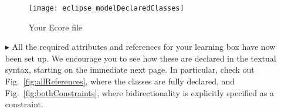 \begin{itemize}
\vspace{1cm}

\begin{figure}[htbp]
	\centering
  \texttt{[image: eclipse\_modelDeclaredClasses]}
	\caption{Your Ecore file}
	\label{fig:model_allClasses}
\end{figure}

\vspace{1cm}

\item[$\blacktriangleright$] All the required attributes and references for your learning box have now been set up. We encourage you to see how these are
declared in the textual syntax, starting on the immediate next page. In particular, check out Fig.~\ref{fig:allReferences}, where the classes are fully
declared, and Fig.~\ref{fig:bothConstraints}, where bidirectionality is explicitly specified as a constraint.


\end{itemize}
